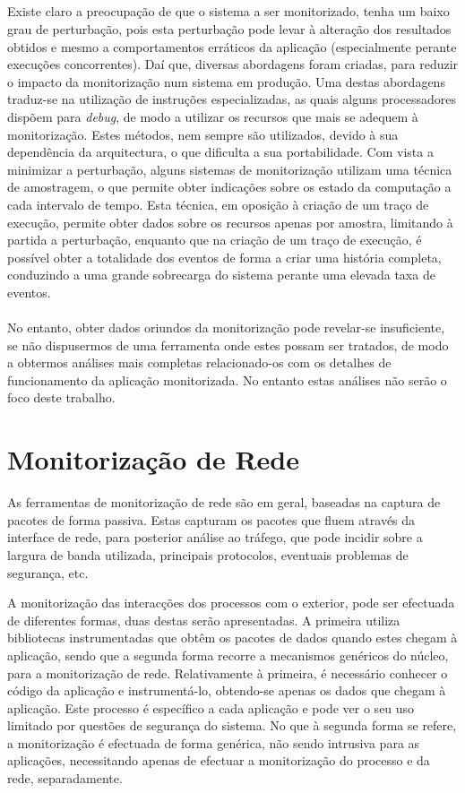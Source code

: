 \subparagraph*{
}
Existe claro a preocupação de que o sistema a ser monitorizado, tenha um baixo grau de perturbação, pois esta perturbação pode levar à alteração dos resultados obtidos e mesmo a comportamentos erráticos da aplicação (especialmente perante execuções concorrentes).
Daí que, diversas abordagens foram criadas, para reduzir o impacto da monitorização num sistema em produção.
Uma destas abordagens traduz-se na utilização de instruções especializadas, as quais alguns processadores dispõem para \textit{debug}, de modo a utilizar os recursos que mais se adequem à monitorização.
Estes métodos, nem sempre são utilizados, devido à sua dependência da arquitectura, o que dificulta a sua portabilidade.
Com vista a minimizar a perturbação, alguns sistemas de monitorização utilizam uma técnica de amostragem, o que permite obter indicações sobre os estado da computação a cada intervalo de tempo.
Esta técnica, em oposição à criação de um traço de execução, permite obter dados sobre os recursos apenas por amostra, limitando à partida a perturbação, enquanto que na criação de um traço de execução, é possível obter a totalidade dos eventos de forma a criar uma história completa, conduzindo a uma grande sobrecarga do sistema perante uma elevada taxa de eventos.

\paragraph*{
}
No entanto, obter dados oriundos da monitorização pode revelar-se insuficiente, se não dispusermos de uma ferramenta onde estes possam ser tratados, de modo a obtermos análises mais completas relacionado-os com os detalhes de funcionamento da aplicação monitorizada.
No entanto estas análises não serão o foco deste trabalho.

\section{Monitorização de Rede}\label{sub:network_monitoring}

As ferramentas de monitorização de rede são em geral, baseadas na captura de pacotes de forma passiva.
Estas capturam os pacotes que fluem através da interface de rede, para posterior análise ao tráfego, que pode incidir sobre a largura de banda utilizada, principais protocolos, eventuais problemas de segurança, etc.

A monitorização das interacções dos processos com o exterior, pode ser efectuada de diferentes formas, duas destas serão apresentadas.
A primeira utiliza bibliotecas instrumentadas que obtêm os pacotes de dados quando estes chegam à aplicação, sendo que a segunda forma recorre a mecanismos genéricos do núcleo, para a monitorização de rede.
Relativamente à primeira, é necessário conhecer o código da aplicação e instrumentá-lo, obtendo-se apenas os dados que chegam à aplicação.
Este processo é específico a cada aplicação e pode ver o seu uso limitado por questões de segurança do sistema.
No que à segunda forma se refere, a monitorização é efectuada de forma genérica, não sendo intrusiva para as aplicações, necessitando apenas de efectuar a monitorização do processo e da rede, separadamente. 

